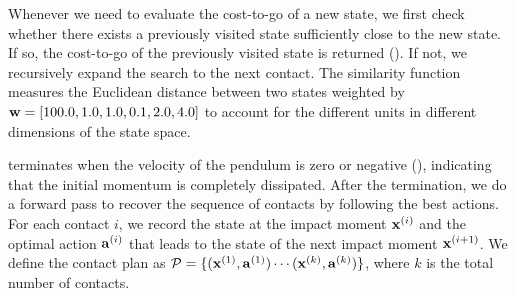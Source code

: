 
Whenever we need to evaluate the cost-to-go of a new state, we first
check whether there exists a previously visited state sufficiently
close to the new state. If so, the cost-to-go of the previously
visited state is returned (). If not, we
recursively expand the search to the next contact.  The similarity
function measures the Euclidean distance between two states weighted
by $\mathbf{w}=[100.0, 1.0, 1.0, 0.1, 2.0, 4.0]$ to account for the
different units in different dimensions of the state space.

 terminates when the velocity of the pendulum is
zero or negative (), indicating that the initial momentum is
completely dissipated. After the termination, we do a forward pass to
recover the sequence of contacts by following the best actions. For
each contact $i$, we record the state at the impact moment
$\mathbf{x}^{(i)}$ and the optimal action $\mathbf{a}^{(i)}$ that leads to the
state of the next impact moment $\mathbf{x}^{(i+1)}$. We define the
contact plan as
$\mathcal{P} = \{ (\mathbf{x}^{(1)}, \mathbf{a}^{(1)}) \cdots (\mathbf{x}^{(k)},
\mathbf{a}^{(k)}) \}$, where $k$ is the total number of contacts.


